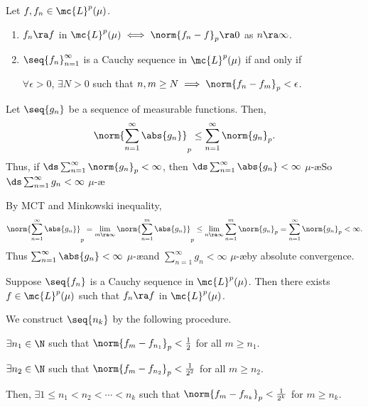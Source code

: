 \pagebreak

  Let \(f, f_n \in \mc{L}^{p}(\mu)\).
\begin{enumerate}
    \item \(f_n \ra f\) in \(\mc{L}^p(\mu) \iff \norm{f_n-f}_p \ra 0\) as \(n \ra \infty\).
    \item \(\seq{f_n}_{n=1}^\infty\) is a Cauchy sequence in \(\mc{L}^{p}(\mu)\) if and only if
          \begin{center}
              \(\forall \epsilon > 0\), \(\exists N > 0\) such that \(n, m \geq N \implies \norm{f_n-f_m}_p < \epsilon\).
          \end{center}
\end{enumerate}

\lemma Let \(\seq{g_n}\) be a sequence of measurable functions. Then,
\[
    \norm{\sum_{n=1}^{\infty} \abs{g_n}}_p \leq \sum_{n=1}^{\infty} \norm{g_n}_p.
\]
Thus, if \(\ds \sum_{n=1}^{\infty} \norm{g_n}_p < \infty\), then \(\ds \sum_{n=1}^{\infty} \abs{g_n} < \infty\) \(\mu\)-\ae So \(\ds \sum_{n=1}^{\infty} g_n < \infty\) \(\mu\)-\ae

\pf By MCT and Minkowski inequality,
\[
    \norm{\sum_{n=1}^{\infty} \abs{g_n}}_p = \lim_{m \ra \infty} \norm{\sum_{n=1}^{m} \abs{g_n}}_p \leq \lim_{n \ra \infty} \sum_{n=1}^{m} \norm{g_n}_p = \sum_{n=1}^{\infty} \norm{g_n}_p < \infty.
\]
Thus \(\sum_{n=1}^{\infty} \abs{g_n} < \infty\) \(\mu\)-\ae and \(\sum_{n=1}^{\infty} g_n < \infty\) \(\mu\)-\ae by absolute convergence.

\medskip

  Suppose \(\seq{f_n}\) is a Cauchy sequence in \(\mc{L}^{p}(\mu)\). Then there exists \(f \in \mc{L}^{p}(\mu)\) such that \(f_n \ra f\) in \(\mc{L}^{p}(\mu)\).

\pf We construct \(\seq{n_k}\) by the following procedure.

\quad \(\exists n_1 \in \N\) such that \(\norm{f_m - f_{n_1}}_p < \frac{1}{2}\) for all \(m \geq n_1\).

\quad \(\exists n_2 \in \N\) such that \(\norm{f_m - f_{n_2}}_p < \frac{1}{2^2}\) for all \(m \geq n_2\).

Then, \(\exists 1 \leq n_1 < n_2 < \cdots < n_k\) such that \(\norm{f_m - f_{n_k}}_p < \frac{1}{2^k}\) for \(m \geq n_k\).

